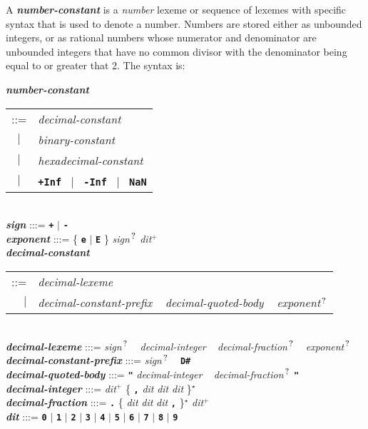 \documentclass[12pt]{article}
\newcommand{\TT}[1]{{\tt \bfseries #1}}
\newcommand{\STAR}{{\Large $^\star$}}
\newcommand{\PLUS}[1][]{{$^{+#1}$}}
\newcommand{\QMARK}{{$^{\,\mbox{\footnotesize ?}}$}}
\newcommand{\ttkey}[1]{{\tt \bfseries #1}}
\newcommand{\emkey}[1]{{\em \bfseries #1}}
\newenvironment{indpar}[1][0.3in]%
	{\begin{list}{}%
		     {\setlength{\itemsep}{0in}%
		      \setlength{\topsep}{0in}%
		      \setlength{\parsep}{1ex}%
		      \setlength{\labelwidth}{#1}%
		      \setlength{\leftmargin}{#1}%
		      \addtolength{\leftmargin}{\labelsep}}%
	 \item}%
	{\end{list}}
\begin{document}
A \emkey{number-constant} is a {\em number} lexeme or sequence of
lexemes with specific syntax
that is used to denote a number.  Numbers are stored either
as unbounded integers, or as rational numbers whose numerator
and denominator are unbounded integers that have no common divisor
with the denominator being equal to or greater that 2.  The syntax is:

\begin{indpar}
\emkey{number-constant}\label{NUMBER-CONSTANT}
    \begin{tabular}[t]{@{}cl}
    ::= & {\em decimal-constant} \\
    $|$ & {\em binary-constant} \\
    $|$ & {\em hexadecimal-constant} \\
    $|$ & \TT{+Inf}\index{Inf@\TT{+Inf}}
          ~$|$~ \TT{-Inf}\index{Inf@\TT{-Inf}}
          ~$|$~ \ttkey{NaN}
    \end{tabular}
\\[0.5ex]
\emkey{sign} :::= \TT{+} $|$ \TT{-} \\
\emkey{exponent} :::=
	\{ \TT{e} $|$ \TT{E} \} {\em sign}\QMARK{} {\em dit}\PLUS{}
\\[0.5ex]
\emkey{decimal-constant} \begin{tabular}[t]{@{}rl@{}}
                         ::= & {\em decimal-lexeme} \\
			 $|$ & {\em decimal-constant-prefix} ~
			       {\em decimal-quoted-body} ~
			       {\em exponent}\QMARK{}
			 \end{tabular}
\\[0.5ex]
\emkey{decimal-lexeme} :::= {\em sign}\QMARK{} ~ {\em decimal-integer} ~
			    {\em decimal-fraction}\QMARK{} ~
                            {\em exponent}\QMARK{}
\\[0.5ex]
\emkey{decimal-constant-prefix} :::= {\em sign}\QMARK{} ~ \TT{D\#}
\\[0.5ex]
\emkey{decimal-quoted-body} :::= \TT{"} {\em decimal-integer} ~
				 {\em decimal-fraction}\QMARK{} \TT{"}
\\[0.5ex]
\emkey{decimal-integer}
    :::= {\em dit}\PLUS{} 
         \{ \TT{,} {\em dit} {\em dit} {\em dit} \}\STAR{} \\
\emkey{decimal-fraction} :::=
    \TT{.} \{ {\em dit} {\em dit} {\em dit} \TT{,} \}\STAR{}
           {\em dit}\PLUS{} \\
\emkey{dit}\label{DIT}
	:::= \TT{0} $|$ \TT{1} $|$ \TT{2} $|$ \TT{3} $|$ \TT{4}
                    $|$ \TT{5} $|$ \TT{6} $|$ \TT{7} $|$ \TT{8} $|$ \TT{9}

\end{indpar}
\end{document}
